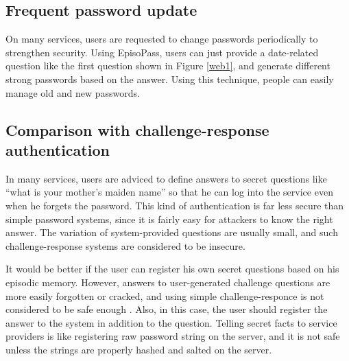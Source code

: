\documentclass[runningheads,a4paper]{llncs}
\begin{document}
\subsection{Frequent password update}

On many services, users are requested to change passwords periodically
to strengthen security.
%
%
Using EpisoPass, users can just provide a date-related question
like the first question shown in Figure \ref{web1},
and generate different strong passwords based on the answer.
Using this technique, people can easily manage old and new passwords.

\subsection{Comparison with challenge-response authentication}


In many services, users are adviced to define answers to secret questions like
``what is your mother's maiden name''
so that he can log into the service even when he forgets the password.
This kind of authentication is far less secure than simple password systems,
since it is fairly easy for attackers to know the right answer.
The variation of system-provided questions are usually small, and
such challenge-response systems are considered to be
insecure\cite{Rabkin:2008:PKQ:1408664.1408667}.

It would be better if the user can register his own secret questions
based on his episodic memory.
However, answers to user-generated challenge questions are more easily
forgotten or cracked,
and using simple challenge-responce is not considered to be safe enough
\cite{Just:2009:PCC:1572532.1572543}\cite{Schechter:2009:NSM:1607723.1608145}.
%
Also, in this case,
the user should register the answer to the system in addition to the question.
Telling secret facts to service providers is like
registering raw password string on the server,
and it is not safe unless the strings are properly hashed and salted on the server.
\end{document}
